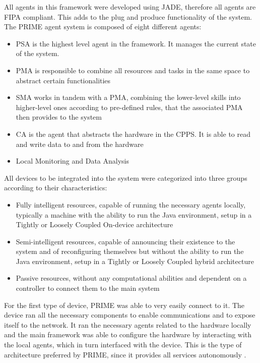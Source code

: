 All agents in this framework were developed using \acrshort{JADE}, therefore all agents are \acrshort{FIPA} compliant. This adds to the plug and produce functionality of the system. The PRIME agent system is composed of eight different agents:
\begin{itemize}
	\item \acrfull{PSA} is the highest level agent in the framework. It manages the current state of the system.
	\item \acrfull{PMA} is responsible to combine all resources and tasks in the same space to abstract certain functionalities
	\item \acrfull{SMA} works in tandem with a \acrshort{PMA}, combining the lower-level skills into higher-level ones according to pre-defined rules, that the associated \acrshort{PMA} then provides to the system
	\item \acrfull{CA} is the agent that abstracts the hardware in the \acrshort{CPPS}. It is able to read and write data to and from the hardware
	\item Local Monitoring and Data Analysis
\end{itemize}

All devices to be integrated into the system were categorized into three groups according to their characteristics:
\begin{itemize}
	\item Fully intelligent resources, capable of running the necessary agents locally, typically a machine with the ability to run the Java environment, setup in a Tightly or Loosely Coupled On-device architecture
	\item Semi-intelligent resources, capable of announcing their existence to the system and of reconfiguring themselves but without the ability to run the Java environment, setup in a Tightly or Loosely Coupled hybrid architecture
	\item Passive resources, without any computational abilities and dependent on a controller to connect them to the main system  
\end{itemize}

For the first type of device, PRIME was able to very easily connect to it. The device ran all the necessary components to enable communications and to expose itself to the network. It ran the necessary agents related to the hardware locally and the main framework was able to configure the hardware by interacting with the local agents, which in turn interfaced with the device. This is the type of architecture preferred by PRIME, since it provides all services autonomously \cite{PRIME_plug_and_produce}.\\

